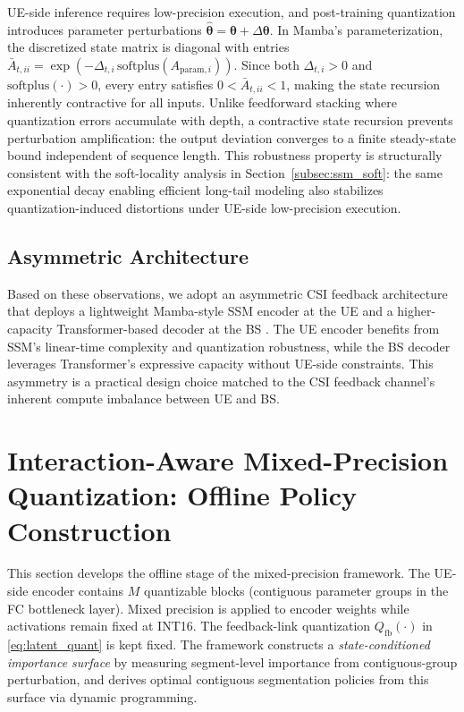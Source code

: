 \documentclass[conference]{IEEEtran}
\begin{document}
UE-side inference requires low-precision execution, and post-training quantization introduces parameter perturbations $\hat{\boldsymbol{\theta}}=\boldsymbol{\theta}+\Delta\boldsymbol{\theta}$.
In Mamba's parameterization, the discretized state matrix is diagonal with entries $\bar{A}_{t,ii}=\exp(-\Delta_{t,i}\,\mathrm{softplus}(A_{\mathrm{param},i}))$. Since both $\Delta_{t,i}>0$ and $\mathrm{softplus}(\cdot)>0$, every entry satisfies $0<\bar{A}_{t,ii}<1$, making the state recursion inherently contractive for all inputs.
Unlike feedforward stacking where quantization errors accumulate with depth, a contractive state recursion prevents perturbation amplification: the output deviation converges to a finite steady-state bound independent of sequence length.
This robustness property is structurally consistent with the soft-locality analysis in Section~\ref{subsec:ssm_soft}: the same exponential decay enabling efficient long-tail modeling also stabilizes quantization-induced distortions under UE-side low-precision execution.

\subsection{Asymmetric Architecture}
\label{subsec:asym_conclude}

Based on these observations, we adopt an asymmetric CSI feedback architecture that deploys a lightweight Mamba-style SSM encoder at the UE \cite{Mamba, VMamba} and a higher-capacity Transformer-based decoder at the BS \cite{TransNet}.
The UE encoder benefits from SSM's linear-time complexity and quantization robustness, while the BS decoder leverages Transformer's expressive capacity without UE-side constraints.
This asymmetry is a practical design choice matched to the CSI feedback channel's inherent compute imbalance between UE and BS.

\section{Interaction-Aware Mixed-Precision Quantization: Offline Policy Construction}
\label{sec:offline}

This section develops the offline stage of the mixed-precision framework. The UE-side encoder contains $M$ quantizable blocks (contiguous parameter groups in the FC bottleneck layer). Mixed precision is applied to encoder weights while activations remain fixed at INT16. The feedback-link quantization $Q_{\mathrm{fb}}(\cdot)$ in \eqref{eq:latent_quant} is kept fixed. The framework constructs a \emph{state-conditioned importance surface} by measuring segment-level importance from contiguous-group perturbation, and derives optimal contiguous segmentation policies from this surface via dynamic programming.
\end{document}
